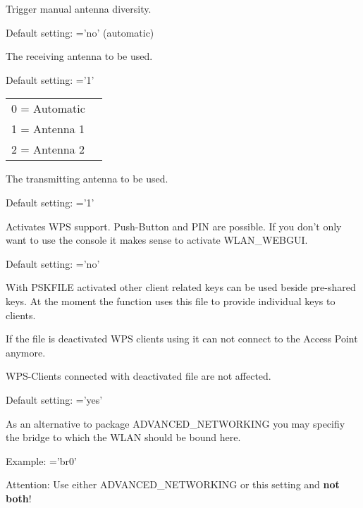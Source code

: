 \begin{description}
        Trigger manual antenna diversity.

        Default setting: ='no' (automatic)


        The receiving antenna to be used.

        Default setting: ='1'

        \begin{tabular}[h]{ll}
        0 = Automatic\\
        1 = Antenna 1\\
        2 = Antenna 2\\
        \end{tabular}


        The transmitting antenna to be used.

        Default setting: ='1'


        Activates WPS support. Push-Button and PIN are possible.
        If you don't only want to use the console it makes sense to activate 
        WLAN\_WEBGUI.

        Default setting: ='no'


        With PSKFILE activated other client related keys can be used beside 
         pre-shared keys. At the moment the function 
         uses this file to provide individual keys to clients. 
        
        If the file is deactivated WPS clients using it can not connect to the 
        Access Point anymore.

        WPS-Clients connected with deactivated file are not affected.

        Default setting: ='yes'


        As an alternative to package ADVANCED\_NETWORKING you may specifiy the 
        bridge to which the WLAN should be bound here.
        
        Example: ='br0'

        Attention: Use either ADVANCED\_NETWORKING or this setting and \textbf{not both}!

\end{description}

